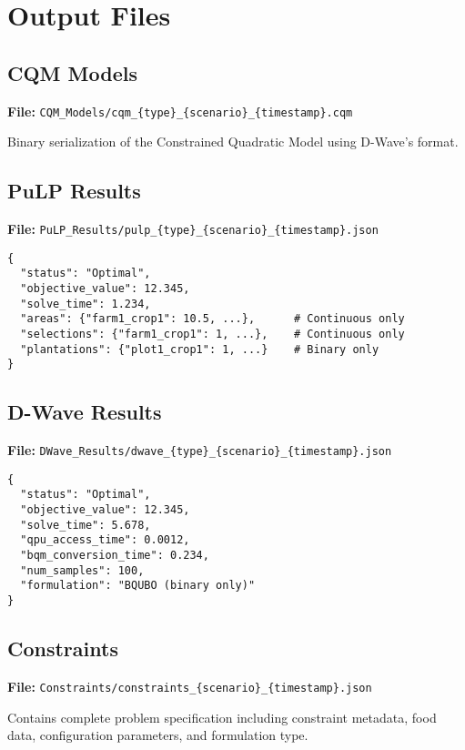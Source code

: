 \documentclass{article}
\begin{document}
\section{Output Files}

\subsection{CQM Models}

\textbf{File:} \texttt{CQM\_Models/cqm\_\{type\}\_\{scenario\}\_\{timestamp\}.cqm}

Binary serialization of the Constrained Quadratic Model using D-Wave's format.

\subsection{PuLP Results}

\textbf{File:} \texttt{PuLP\_Results/pulp\_\{type\}\_\{scenario\}\_\{timestamp\}.json}

\begin{verbatim}
{
  "status": "Optimal",
  "objective_value": 12.345,
  "solve_time": 1.234,
  "areas": {"farm1_crop1": 10.5, ...},      # Continuous only
  "selections": {"farm1_crop1": 1, ...},    # Continuous only
  "plantations": {"plot1_crop1": 1, ...}    # Binary only
}
\end{verbatim}

\subsection{D-Wave Results}

\textbf{File:} \texttt{DWave\_Results/dwave\_\{type\}\_\{scenario\}\_\{timestamp\}.json}

\begin{verbatim}
{
  "status": "Optimal",
  "objective_value": 12.345,
  "solve_time": 5.678,
  "qpu_access_time": 0.0012,
  "bqm_conversion_time": 0.234,
  "num_samples": 100,
  "formulation": "BQUBO (binary only)"
}
\end{verbatim}

\subsection{Constraints}

\textbf{File:} \texttt{Constraints/constraints\_\{scenario\}\_\{timestamp\}.json}

Contains complete problem specification including constraint metadata, food data, configuration parameters, and formulation type.
\end{document}
